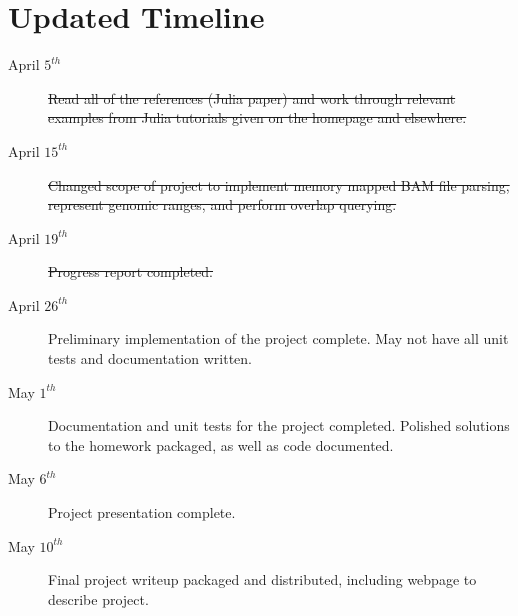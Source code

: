 \documentclass[10pt]{article}
\begin{document}
%
%
%
%
%
%
\section{Updated Timeline}

\begin{description}
\item[April $5^{th}$] \sout{Read all of the references (Julia paper) and work
  through relevant examples from Julia tutorials given on the homepage
  and elsewhere.}

\item[April $15^{th}$] \sout{Changed scope of project to implement memory mapped BAM file parsing, represent genomic ranges, and perform overlap querying. }

\item[April $19^{th}$] \sout{Progress report completed.}

\item[April $26^{th}$] Preliminary implementation of the project
  complete. May not have all unit tests and documentation written.  

\item[May $1^{th}$] Documentation and unit tests for the project
  completed.  Polished solutions to the homework packaged, as well as
  code documented.

\item[May $6^{th}$] Project presentation complete.

\item[May $10^{th}$] Final project writeup packaged and distributed,
  including webpage to describe project.

\end{description}
\end{document}
